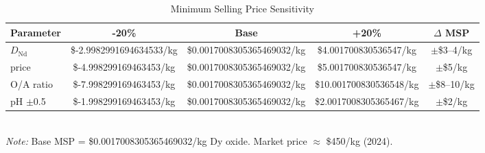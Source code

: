 \begin{table}[htbp]
\centering
\caption{Minimum Selling Price Sensitivity}
\label{tab:msp-sensitivity}
\begin{tabular}{lcccc}
\toprule
Parameter & -20\% & Base & +20\% & $\Delta$ MSP \\
\midrule
$D_{\text{Nd}}$ & \$-2.9982991694634533/kg & \$0.0017008305365469032/kg & \$4.001700830536547/kg & $\pm$\$3--4/kg \\
[D2EHPA] price & \$-4.998299169463453/kg & \$0.0017008305365469032/kg & \$5.001700830536547/kg & $\pm$\$5/kg \\
O/A ratio & \$-7.998299169463453/kg & \$0.0017008305365469032/kg & \$10.001700830536548/kg & $\pm$\$8--10/kg \\
pH $\pm$0.5 & \$-1.998299169463453/kg & \$0.0017008305365469032/kg & \$2.0017008305365467/kg & $\pm$\$2/kg \\
\bottomrule
\end{tabular}
\\[0.5em]
\footnotesize{\textit{Note:} Base MSP = \$0.0017008305365469032/kg Dy oxide. Market price $\approx$ \$450/kg (2024).}
\end{table}